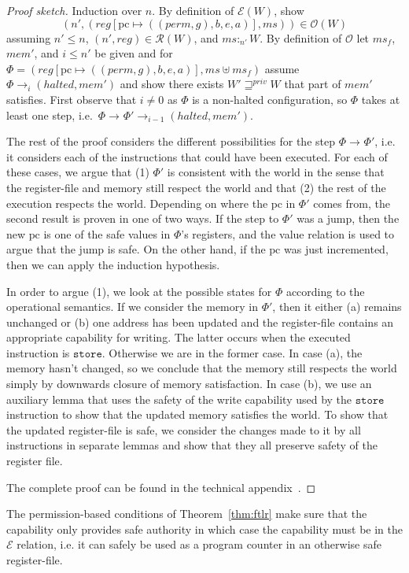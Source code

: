 \documentclass[format=acmsmall, review=true, screen=true]{acmart}
\newcommand{\update}[2]{[#1 \mapsto #2]}
\newcommand{\var}[1]{\mathit{#1}}
\newcommand{\hs}{\var{ms}}
\newcommand{\ms}{\hs}
\newcommand{\gl}{\var{g}}
\newcommand{\pcreg}{\mathrm{pc}}
\newcommand{\addr}{\var{a}}
\newcommand{\start}{\var{b}}
\newcommand{\addrend}{\var{e}}
\newcommand{\mem}{\var{mem}}
\newcommand{\reg}{\var{reg}}
\newcommand{\heap}{\var{mem}}
\newcommand{\perm}{\var{perm}}
\newcommand{\halted}{\mathit{halted}}
\newcommand{\futurestr}{\mathbin{\sqsupseteq}^{\var{priv}}}
\newcommand{\heapSat}[3][\heap]{#1 :_{#2} #3}
\newcommand{\asmType}{\plaindom{AsmType}}
\newcommand{\plaindom}[1]{\mathrm{#1}}
\newcommand{\intr}[2]{\mathcal{#1}}
\newcommand{\exprintr}[1]{\intr{E}{#1}}
\newcommand{\regintr}[1]{\intr{R}{#1}}
\newcommand{\stder}{\exprintr{\asmType}}
\newcommand{\stdrr}{\regintr{\asmType}}
\newcommand{\observations}{\mathcal{O}}
\newcommand{\npair}[2][n]{\left(#1,#2 \right)}
\newcommand{\step}[1][]{\rightarrow_{#1}}
\newenvironment{toplas}{}{}
\begin{document}
\begin{toplas}
  \begin{proof}[Proof sketch]
    Induction over $n$. By definition of $\stder(W)$, show
    \[
      \npair[n']{(\reg\update{\pcreg}{((\perm,\gl),\start,\addrend,\addr)},\ms)}
      \in \observations(W)
    \]
    assuming $n' \leq n$, $\npair[n']{\reg} \in \stdrr(W)$, and
    $\heapSat[\ms]{n'}{W}$. By definition of $\observations$ let $\ms_f$,
    $\mem'$, and $i \leq n'$ be given and for
    $\Phi = (\reg\update{\pcreg}{((\perm,\gl),\start,\addrend,\addr)},\ms \uplus
    \ms_f)$ assume $\Phi \step[i]
    (\halted,\mem')$ and show there exists $W' \futurestr W$ that part of
    $\mem'$ satisfies. First observe that $i \neq 0$ as $\Phi$ is a non-halted
    configuration, so $\Phi$ takes at least one step, i.e.\ $\Phi \step
    \Phi' \step[i-1] (\halted,\mem')$.

    The rest of the proof considers the different possibilities for the step $\Phi \step
    \Phi'$, i.e. it considers each of the instructions that could have been executed. For
    each of these cases, we argue that (1) $\Phi'$ is consistent with the world
    in the sense that the register-file and memory still respect the world and
    that (2) the rest of the execution respects the world. Depending on where
    the $\pcreg$ in $\Phi'$ comes from, the second result is proven in one of
    two ways. If the step to $\Phi'$ was a jump, then the new $\pcreg$ is one of
    the safe values in $\Phi$'s registers, and the value relation is used to
    argue that the jump is safe. On the other hand, if the $\pcreg$
    was just incremented, then we can apply the induction hypothesis.

    In order to argue (1), we look at the possible states for $\Phi$ according to the operational semantics.
    If we consider the memory in $\Phi'$, then it either (a) remains unchanged or (b) one address has been updated and the register-file contains an appropriate capability for writing.
    The latter occurs when the executed instruction is $\texttt{store}$.
    Otherwise we are in the former case.
    In case (a), the memory hasn't changed, so we conclude that the memory still respects the world simply by downwards closure of memory satisfaction.
    In case (b), we use an auxiliary lemma that uses the safety of the write capability used by the $\texttt{store}$ instruction to show that the updated memory satisfies the world.
    To show that the updated register-file is safe, we consider the changes made to it by all instructions in separate lemmas and show that they all preserve safety of the register file.

    The complete proof can be found in the technical appendix~\citep{technical_appendix}.
  \end{proof}
\end{toplas}
The permission-based conditions of Theorem~\ref{thm:ftlr} make sure that the
capability only provides safe authority in which case the capability must be in
the $\stder$ relation, i.e. it can safely be used as a program counter in an
otherwise safe register-file.
\end{document}
